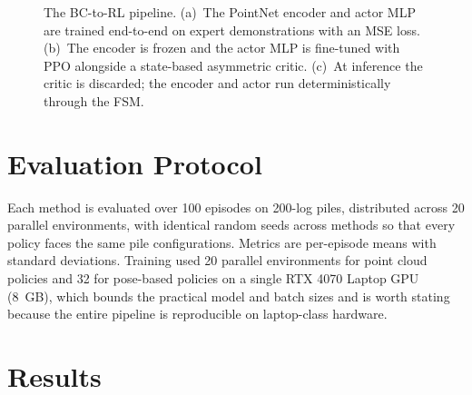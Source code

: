 \begin{figure}[t]
{%
}
\caption{The BC-to-RL pipeline. (a)~The PointNet encoder and actor MLP are
trained end-to-end on expert demonstrations with an MSE loss. (b)~The encoder
is frozen and the actor MLP is fine-tuned with PPO alongside a state-based
asymmetric critic. (c)~At inference the critic is discarded; the encoder and
actor run deterministically through the FSM.}
\label{fig:study_pipeline}
\end{figure}

\section{Evaluation Protocol}
\label{sec:study_protocol}

Each method is evaluated over 100 episodes on 200-log piles, distributed
across 20 parallel environments, with identical random seeds across methods
so that every policy faces the same pile configurations. Metrics are
per-episode means with standard deviations. Training used 20 parallel
environments for point cloud policies and 32 for pose-based policies on a
single RTX 4070 Laptop GPU (8~GB), which bounds the practical model and batch
sizes and is worth stating because the entire pipeline is reproducible on
laptop-class hardware.

\section{Results}
\label{sec:study_results}

